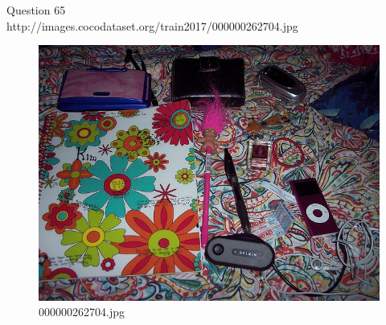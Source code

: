 Question 65\\
http://images.cocodataset.org/train2017/000000262704.jpg
\begin{figure}[h]
    \centering
    \includegraphics[width=0.8\linewidth]{../image set/hard/000000262704.jpg}
    \caption{000000262704.jpg}
\end{figure}
